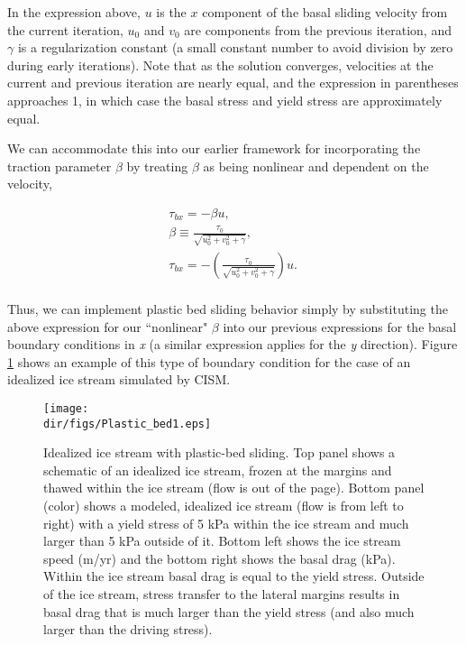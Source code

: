 In the expression above, $u$ is the $x$ component of the basal sliding velocity from the current iteration, $u_0$ and $v_0$ are components from the previous iteration, and $\gamma$ is a regularization constant (a small constant number to avoid division by zero during early iterations). Note that as the solution converges, velocities at the current and previous iteration are nearly equal, and the expression in parentheses approaches 1, in which case the basal stress and yield stress are approximately equal. 

We can accommodate this into our earlier framework for incorporating the traction parameter $\beta$ by treating $\beta$ as being nonlinear and dependent on the velocity,

\begin{equation}
\begin{split}
  & \tau _{bx}=-\beta u,\quad \quad  \\ 
 & \beta \equiv \frac{\tau _{0}}{\sqrt{u_{0}^{2}+v_{0}^{2}+\gamma }},\quad  \\ 
 & \tau _{bx}=-\left( \frac{\tau _{0}}{\sqrt{u_{0}^{2}+v_{0}^{2}+\gamma }} \right)u.\quad  \\
\end{split}
\end{equation}

Thus, we can implement plastic bed sliding behavior simply by substituting the above expression for our ``nonlinear" \textit{{\large \(\beta{}\)}} into our previous expressions for the basal boundary conditions in \textit{x} (a similar expression applies for the \textit{y} direction). 
Figure \ref{fig:plasticbed1} shows an example of this type of boundary condition for the case of an idealized ice stream simulated by CISM.

\begin{figure}
  \begin{center}
    \texttt{[image: \\dir/figs/Plastic\_bed1.eps]}
  \end{center}
  \caption{Idealized ice stream with plastic-bed sliding. Top panel shows a schematic of an idealized ice stream, frozen at the margins and thawed within the ice stream (flow is out of the page). Bottom panel (color) shows a modeled, idealized ice stream (flow is from left to right) with a yield stress of 5 kPa within the ice stream and much larger than 5 kPa outside of it. Bottom left shows the ice stream speed (m/yr) and the bottom right shows the basal drag (kPa). Within the ice stream basal drag is equal to the yield stress. Outside of the ice stream, stress transfer to the lateral margins results in basal drag that is much larger than the yield stress (and also much larger than the driving stress).}
  \label{fig:plasticbed1}
\end{figure} 

